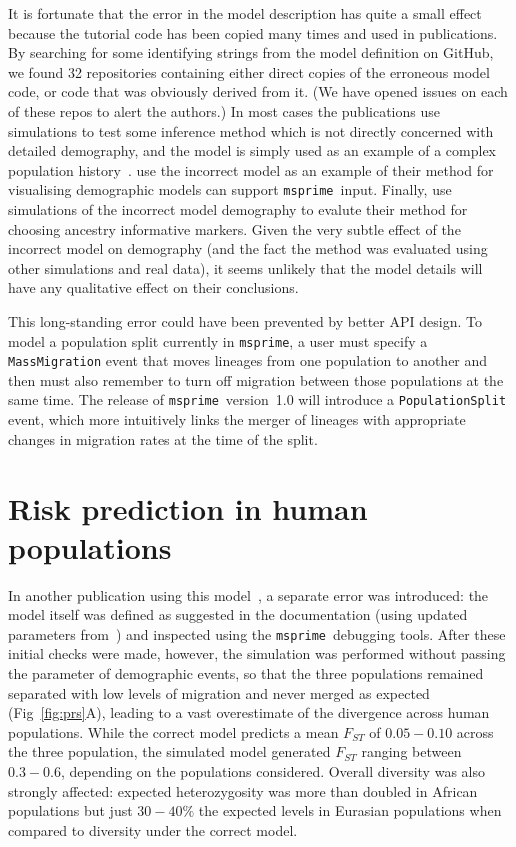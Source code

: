 \documentclass{article}
\newcommand{\msprime}[0]{\texttt{msprime}}
\begin{document}
It is fortunate that the error in the model description has quite a
small effect because the tutorial code has been copied many times
and used in publications. By searching for some identifying strings
from the model definition on GitHub,
we found 32 repositories containing either direct copies of the
erroneous model code, or code that was obviously derived from it.
(We have opened issues on each of these repos to alert the authors.)
In most cases the publications use simulations to test some inference
method which is not directly concerned with detailed demography,
and the model is simply used as an example of a complex population
history~\citep{kelleher2019inferring,albers2020dating,tong2020population}.
\cite{zhou2018popdemog} use the incorrect model as an example
of their method for visualising demographic models can support
\msprime\ input.
Finally, \cite{pfaffelhuber2020choose}
use simulations of the incorrect model demography to evalute
their method for choosing ancestry informative markers.
Given the very subtle effect of the incorrect
model on demography (and the fact the method was evaluated using other
simulations and real data), it seems unlikely that the model details
will have any qualitative effect on their conclusions.

This long-standing error could have been prevented by better API design.
To model a population split currently in \msprime, a user must specify a
\texttt{MassMigration} event that moves lineages from one population to another
and then must also remember to turn off migration
between those populations at the same time.
The release of \msprime\ version~1.0 will introduce a \texttt{PopulationSplit} event,
which more intuitively links the merger of lineages with appropriate changes in
migration rates at the time of the split.

\section{Risk prediction in human populations}

In another publication using this model~\citep{martin2017human},
a separate error was introduced: the model itself was defined as suggested
in the documentation (using updated parameters
from~\citet{gravel2011demographic}) and inspected
using the \msprime\ debugging tools.
After these initial checks were made, however, the simulation
was performed without passing the parameter of demographic events,
so that the three populations remained separated with low levels of migration and
never merged as expected (Fig~\ref{fig:prs}A),
leading to a vast overestimate of the divergence across human populations.
While the correct model predicts a mean $F_{ST}$ of
$0.05 - 0.10$ across the three population, the simulated model generated $F_{ST}$
ranging between $0.3 - 0.6$, depending on the populations considered.
Overall diversity was also strongly affected: expected heterozygosity was more than
doubled in African populations but just $30-40\%$ the expected
levels in Eurasian populations when compared to diversity under the correct model.
\end{document}

